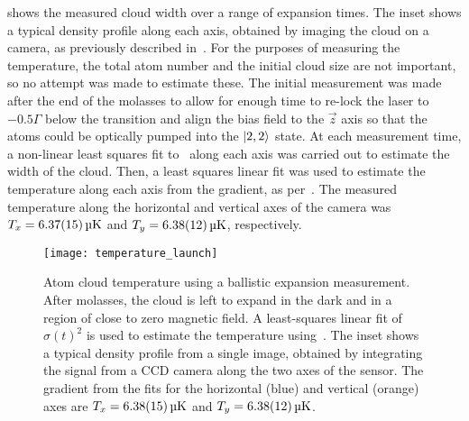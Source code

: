  shows the measured cloud width over a range of expansion times. The inset shows a typical density profile along each axis, obtained by imaging the cloud on a camera, as previously described in~. For the purposes of measuring the temperature, the total atom number and the initial cloud size are not important, so no attempt was made to estimate these. The initial measurement was made  after the end of the molasses to allow for enough time to re-lock the laser to \(-0.5\Gamma\) below the  transition and align the bias field to the \(\vec{z}\) axis so that the atoms could be optically pumped into the \(\ket{2,2}\) state. At each measurement time, a non-linear least squares fit to~ along each axis was carried out to estimate the width of the cloud. Then, a least squares linear fit was used to estimate the temperature along each axis from the gradient, as per~. The measured temperature along the horizontal and vertical axes of the camera was \(T_x = \sivalue{6.37 \pm0.15}{\micro\kelvin}\) and \(T_y = \sivalue{6.38\pm0.12}{\micro\kelvin}\), respectively.  

\begin{figure}[!htbp]
    \centering
    \texttt{[image: temperature\_launch]}
    \caption[Temperature measurement using ballistic expansion]{Atom cloud temperature using a ballistic expansion measurement. After molasses, the cloud is left to expand in the dark and in a region of close to zero magnetic field. A least-squares linear fit of \(\sigma(t)^2\) is used to estimate the temperature using~. The inset shows a typical density profile from a single image, obtained by integrating the signal from a CCD camera along the two axes of the sensor. The gradient from the fits for the horizontal (blue) and vertical (orange) axes are  \(T_x = \sivalue{6.38 \pm0.15}{\micro\kelvin}\) and \(T_y = \sivalue{6.38\pm0.12}{\micro\kelvin}\).}
    \label{fig:molasses_temperature}
\end{figure}

